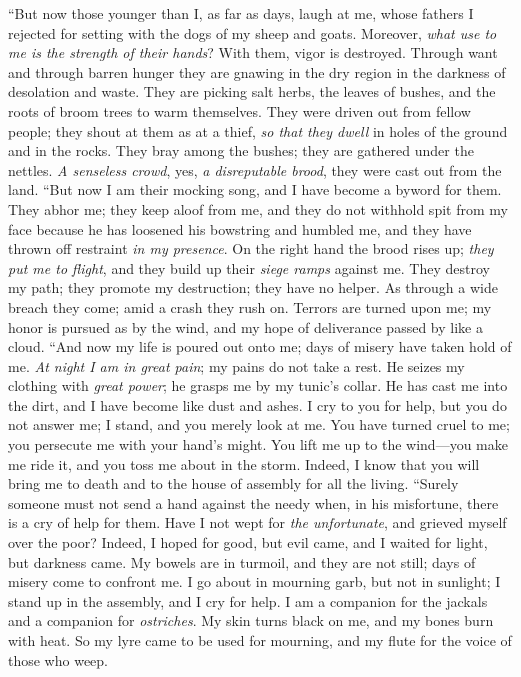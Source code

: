 \begin{biblechapter} %
 “But now those younger than I, as far as days, laugh at me, 
whose fathers I rejected for setting with the dogs of my sheep and goats.
\verse Moreover, \textit{what use to me is the strength of their hands}? 
With them, vigor is destroyed.
\verse Through want and through barren hunger 
they are gnawing in the dry region in the darkness of desolation and waste.
\verse They are picking salt herbs, the leaves of bushes, 
and the roots of broom trees to warm themselves.
\verse They were driven out from fellow people; 
they shout at them as at a thief,
\verse \textit{so that they dwell} 
in holes of the ground and in the rocks.
\verse They bray among the bushes; 
they are gathered under the nettles.
\verse \textit{A senseless crowd}, yes, \textit{a disreputable brood}, 
they were cast out from the land.
\verse “But now I am their mocking song, 
and I have become a byword for them.
\verse They abhor me; they keep aloof from me, 
and they do not withhold spit from my face
\verse because he has loosened his bowstring and humbled me, 
and they have thrown off restraint \textit{in my presence}.
\verse On the right hand the brood rises up; 
\textit{they put me to flight}, 
and they build up their \textit{siege ramps} against me.
\verse They destroy my path; 
they promote my destruction; 
they have no helper.
\verse As through a wide breach they come; 
amid a crash they rush on.
\verse Terrors are turned upon me; 
my honor is pursued as by the wind, 
and my hope of deliverance passed by like a cloud.
\verse “And now my life is poured out onto me; 
days of misery have taken hold of me.
\verse \textit{At night I am in great pain}; 
my pains do not take a rest.
\verse He seizes my clothing with \textit{great power}; 
he grasps me by my tunic’s collar.
\verse He has cast me into the dirt, 
and I have become like dust and ashes.
\verse I cry to you for help, but you do not answer me; 
I stand, and you merely look at me.
\verse You have turned cruel to me; 
you persecute me with your hand’s might.
\verse You lift me up to the wind—you make me ride it, 
and you toss me about in the storm.
\verse Indeed, I know that you will bring me to death 
and to the house of assembly for all the living.
\verse “Surely someone must not send a hand against the needy 
when, in his misfortune, there is a cry of help for them.
\verse Have I not wept for \textit{the unfortunate}, 
and grieved myself over the poor?
\verse Indeed, I hoped for good, but evil came, 
and I waited for light, but darkness came.
\verse My bowels are in turmoil, and they are not still; 
days of misery come to confront me.
\verse I go about in mourning garb, but not in sunlight; 
I stand up in the assembly, and I cry for help.
\verse I am a companion for the jackals 
and a companion for \textit{ostriches}.
\verse My skin turns black on me, 
and my bones burn with heat.
\verse So my lyre came to be used for mourning, 
and my flute for the voice of those who weep.
\end{biblechapter}


